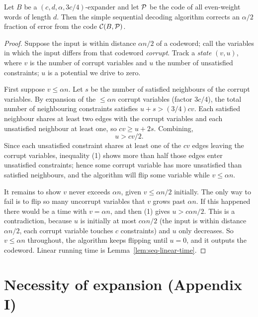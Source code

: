\begin{theorem}
  \label{thm:seq-correct}
  Let $B$ be a $(c,d,\alpha,3c/4)$-expander and let $\mathcal{P}$ be the code of all
  even-weight words of length $d$. Then the simple sequential decoding algorithm
  corrects an $\alpha/2$ fraction of error from the code $\mathcal{C}(B,\mathcal{P})$.
\end{theorem}
\begin{proof}
  Suppose the input is within distance $\alpha n/2$ of a codeword; call the
  variables in which the input differs from that codeword \emph{corrupt}. Track
  a \emph{state} $(v,u)$, where $v$ is the number of corrupt variables and $u$
  the number of unsatisfied constraints; $u$ is a potential we drive to zero.

  First suppose $v \le \alpha n$. Let $s$ be the number of satisfied neighbours
  of the corrupt variables. By expansion of the $\le \alpha n$ corrupt
  variables (factor $3c/4$), the total number of neighbouring constraints
  satisfies $u + s > (3/4)cv$. Each satisfied neighbour shares at least two
  edges with the corrupt variables and each unsatisfied neighbour at least one,
  so $cv \ge u + 2s$. Combining,
  \[
    u > cv/2. \tag{1}
  \]
  Since each unsatisfied constraint shares at least one of the $cv$ edges
  leaving the corrupt variables, inequality (1) shows more than half those
  edges enter unsatisfied constraints; hence some corrupt variable has more
  unsatisfied than satisfied neighbours, and the algorithm will flip some
  variable while $v \le \alpha n$.

  It remains to show $v$ never exceeds $\alpha n$, given $v \le \alpha n/2$
  initially. The only way to fail is to flip so many uncorrupt variables that
  $v$ grows past $\alpha n$. If this happened there would be a time with
  $v=\alpha n$, and then (1) gives $u > c\alpha n/2$. This is a contradiction,
  because $u$ is initially at most $c\alpha n/2$ (the input is within distance
  $\alpha n/2$, each corrupt variable touches $c$ constraints) and $u$ only
  decreases. So $v \le \alpha n$ throughout, the algorithm keeps flipping until
  $u=0$, and it outputs the codeword. Linear running time is
  Lemma~\ref{lem:seq-linear-time}.
\end{proof}

\chapter{Necessity of expansion (Appendix I)}

